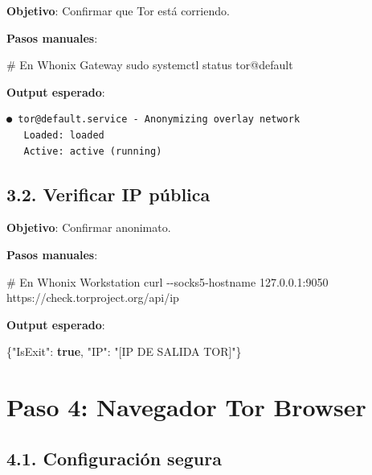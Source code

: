 \documentclass[
  letterpaper,
]{report}
\newenvironment{Shaded}{\begin{snugshade}}{\end{snugshade}}
\newcommand{\AttributeTok}[1]{\textcolor[rgb]{0.40,0.45,0.13}{#1}}
\newcommand{\CommentTok}[1]{\textcolor[rgb]{0.37,0.37,0.37}{#1}}
\newcommand{\DataTypeTok}[1]{\textcolor[rgb]{0.68,0.00,0.00}{#1}}
\newcommand{\ExtensionTok}[1]{\textcolor[rgb]{0.00,0.23,0.31}{#1}}
\newcommand{\FunctionTok}[1]{\textcolor[rgb]{0.28,0.35,0.67}{#1}}
\newcommand{\KeywordTok}[1]{\textcolor[rgb]{0.00,0.23,0.31}{\textbf{#1}}}
\newcommand{\NormalTok}[1]{\textcolor[rgb]{0.00,0.23,0.31}{#1}}
\newcommand{\StringTok}[1]{\textcolor[rgb]{0.13,0.47,0.30}{#1}}
\begin{document}
\textbf{Objetivo}: Confirmar que Tor está corriendo.

\textbf{Pasos manuales}:

\begin{Shaded}
\begin{Highlighting}[]
\CommentTok{\# En Whonix Gateway}
\FunctionTok{sudo}\NormalTok{ systemctl status tor@default}
\end{Highlighting}
\end{Shaded}

\textbf{Output esperado}:

\begin{verbatim}
● tor@default.service - Anonymizing overlay network
   Loaded: loaded
   Active: active (running)
\end{verbatim}

\subsection{3.2. Verificar IP pública}\label{verificar-ip-puxfablica}

\textbf{Objetivo}: Confirmar anonimato.

\textbf{Pasos manuales}:

\begin{Shaded}
\begin{Highlighting}[]
\CommentTok{\# En Whonix Workstation}
\ExtensionTok{curl} \AttributeTok{{-}{-}socks5{-}hostname}\NormalTok{ 127.0.0.1:9050 https://check.torproject.org/api/ip}
\end{Highlighting}
\end{Shaded}

\textbf{Output esperado}:

\begin{Shaded}
\begin{Highlighting}[]
\FunctionTok{\{}\DataTypeTok{"IsExit"}\FunctionTok{:} \KeywordTok{true}\FunctionTok{,} \DataTypeTok{"IP"}\FunctionTok{:} \StringTok{"[IP DE SALIDA TOR]"}\FunctionTok{\}}
\end{Highlighting}
\end{Shaded}

\section{Paso 4: Navegador Tor
Browser}\label{paso-4-navegador-tor-browser}

\subsection{4.1. Configuración segura}\label{configuraciuxf3n-segura}
\end{document}
